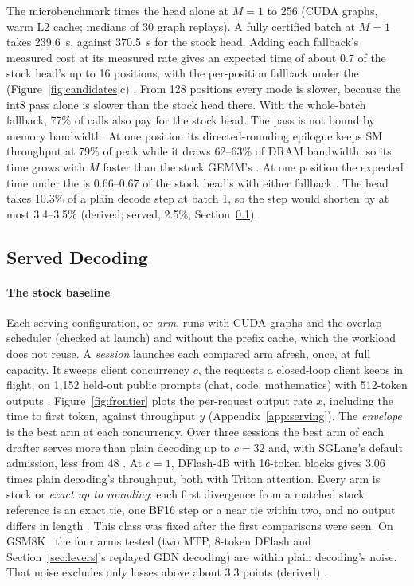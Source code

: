 The microbenchmark times the head alone at $M=1$ to 256 (CUDA graphs, warm L2 cache; medians of 30 graph replays). A fully certified batch at $M=1$ takes 239.6~\textmu s, against 370.5~\textmu s for the stock head. Adding each fallback's measured cost at its measured rate gives an expected time of about 0.7 of the stock head's up to 16 positions, with the per-position fallback under the \modelcons{} (Figure~\ref{fig:candidates}c) . From 128 positions every mode is slower, because the int8 pass alone is slower than the stock head there. With the whole-batch fallback, 77\% of calls also pay for the stock head. The pass is not bound by memory bandwidth. At one position its directed-rounding epilogue keeps SM throughput at 79\% of peak while it draws 62--63\% of DRAM bandwidth, so its time grows with $M$ faster than the stock GEMM's . At one position the expected time under the \modelcons{} is 0.66--0.67 of the stock head's with either fallback . The head takes 10.3\% of a plain decode step at batch 1, so the step would shorten by at most 3.4--3.5\% (derived; served, 2.5\%, Section~\ref{sec:served}).

\subsection{Served Decoding}\label{sec:served}
\paragraph{The stock baseline} Each serving configuration, or \emph{arm}, runs with CUDA graphs and the overlap scheduler (checked at launch) and without the prefix cache, which the workload does not reuse. A \emph{session} launches each compared arm afresh, once, at full capacity. It sweeps client concurrency $c$, the requests a closed-loop client keeps in flight, on 1,152 held-out public prompts (chat, code, mathematics) with 512-token outputs . Figure~\ref{fig:frontier} plots the per-request output rate $x$, including the time to first token, against throughput $y$ (Appendix~\ref{app:serving}). The \emph{envelope} is the best arm at each concurrency. Over three sessions the best arm of each drafter serves more than plain decoding up to $c=32$ and, with SGLang's default admission, less from 48 . At $c=1$, DFlash-4B with 16-token blocks gives 3.06 times plain decoding's throughput, both with Triton attention. Every arm is stock or \emph{exact up to rounding}: each first divergence from a matched stock reference is an exact tie, one BF16 step or a near tie within two, and no output differs in length . This class was fixed after the first comparisons were seen. On GSM8K~\cite{gsm8k} the four arms tested (two MTP, 8-token DFlash and Section~\ref{sec:levers}'s replayed GDN decoding) are within plain decoding's noise. That noise excludes only losses above about 3.3 points (derived) .

